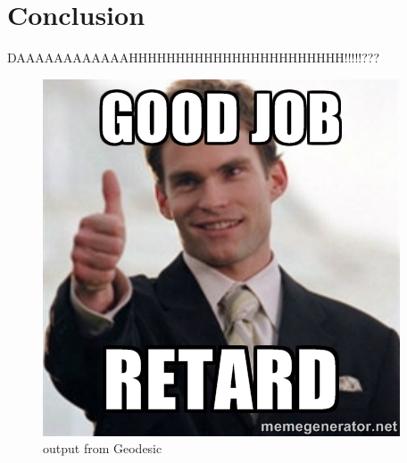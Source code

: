 \chapter{Conclusion}
DAAAAAAAAAAAAHHHHHHHHHHHHHHHHHHHHHHH!!!!!???

\begin{figure}[H]
\centering
\includegraphics[height=1.0\linewidth ]{figure/Conclusion/retard.jpg}
\caption{output from Geodesic}
\end{figure}